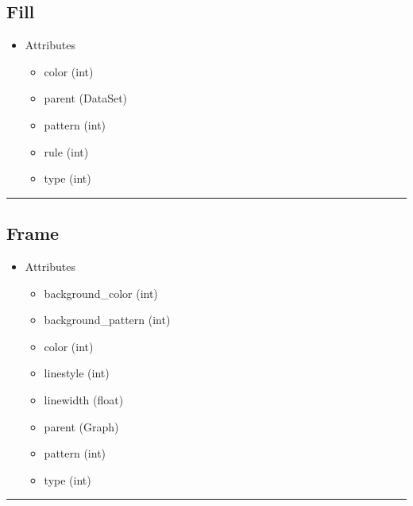 \documentclass[10pt]{article}
\begin{document}
\begin{multicols}{4}
\subsection*{\footnotesize Fill}
\begin{itemize}
\item Attributes
\begin{itemize}
\item color (int)
\item parent (DataSet)
\item pattern (int)
\item rule (int)
\item type (int)
\end{itemize}
\end{itemize}
\vspace{0.5em}
\hrule
\vspace{0.1em}
\subsection*{\footnotesize Frame}
\begin{itemize}
\item Attributes
\begin{itemize}
\item background\_color (int)
\item background\_pattern (int)
\item color (int)
\item linestyle (int)
\item linewidth (float)
\item parent (Graph)
\item pattern (int)
\item type (int)
\end{itemize}
\end{itemize}
\vspace{0.5em}
\hrule
\vspace{0.1em}

\end{multicols}
\end{document}
